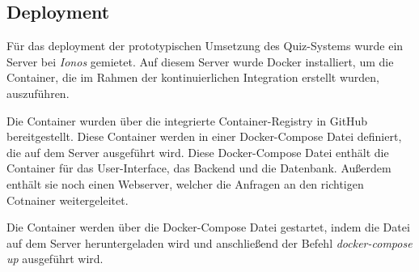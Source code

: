 \subsection{Deployment}

Für das deployment der prototypischen Umsetzung des Quiz-Systems wurde ein Server bei \textit{Ionos} 
gemietet. Auf diesem Server wurde Docker installiert, um die Container, die im Rahmen der
kontinuierlichen Integration erstellt wurden, auszuführen.\newline

\noindent Die Container wurden über die integrierte Container-Registry in GitHub bereitgestellt.
Diese Container werden in einer Docker-Compose Datei definiert, die auf dem Server ausgeführt wird.
Diese Docker-Compose Datei enthält die Container für das User-Interface, das Backend und die Datenbank.
Außerdem enthält sie noch einen Webserver, welcher die Anfragen an den richtigen Cotnainer weitergeleitet.\newline

\noindent Die Container werden über die Docker-Compose Datei gestartet, indem die Datei auf dem Server
heruntergeladen wird und anschließend der Befehl \textit{docker-compose up} ausgeführt wird. \\

